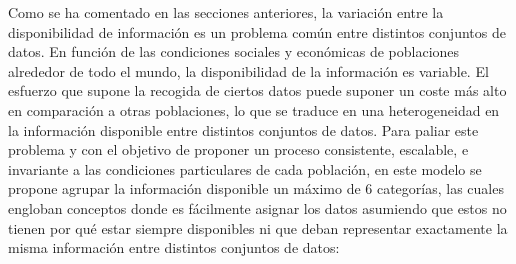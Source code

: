 \documentclass{uathesis-es}
\begin{document}
{%


Como se ha comentado en las secciones anteriores, la variación entre la disponibilidad de información es un problema común entre distintos conjuntos de datos. En función de las condiciones sociales y económicas de poblaciones alrededor de todo el mundo, la disponibilidad de la información es variable. El esfuerzo que supone la recogida de ciertos datos puede suponer un coste más alto en comparación a otras poblaciones, lo que se traduce en una heterogeneidad en la información disponible entre distintos conjuntos de datos. Para paliar este problema y con el objetivo de proponer un proceso consistente, escalable, e invariante a las condiciones particulares de cada población, en este modelo se propone agrupar la información disponible un máximo de 6 categorías, las cuales engloban conceptos donde es fácilmente asignar los datos asumiendo que estos no tienen por qué estar siempre disponibles ni que deban representar exactamente la misma información entre distintos conjuntos de datos:

}
\end{document}
